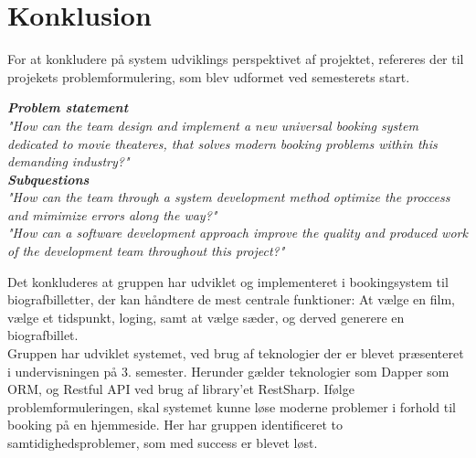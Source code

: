 \chapter{Konklusion}\label{ch:konklusion}
For at konkludere på system udviklings perspektivet af projektet, refereres der til projekets problemformulering,
som blev udformet ved semesterets start.

\begin{center}
\textit{\textbf{Problem statement} \\
"How can the team design and implement a new universal booking system dedicated to movie theateres, 
that solves modern booking problems within this demanding industry?"} \\

\textit{\textbf{Subquestions}\\
"How can the team through a system development method optimize the proccess and mimimize errors along the way?"}\\

\textit{"How can a software development approach improve the quality and 
produced work of the development team throughout this project?"}\\
\end{center} 

Det konkluderes at gruppen har udviklet og implementeret i bookingsystem til biografbilletter, der kan håndtere de 
mest centrale funktioner: At vælge en film, vælge et tidspunkt, loging, samt at vælge sæder, og derved generere en 
biografbillet. \\


Gruppen har udviklet systemet, ved brug af teknologier der er blevet præsenteret i undervisningen på 3. semester. Herunder gælder teknologier
som Dapper som ORM, og Restful API ved brug af library'et RestSharp. Ifølge problemformuleringen, skal systemet kunne løse 
moderne problemer i forhold til booking på en hjemmeside. Her har gruppen identificeret to samtidighedsproblemer, som med success er blevet løst. \\


